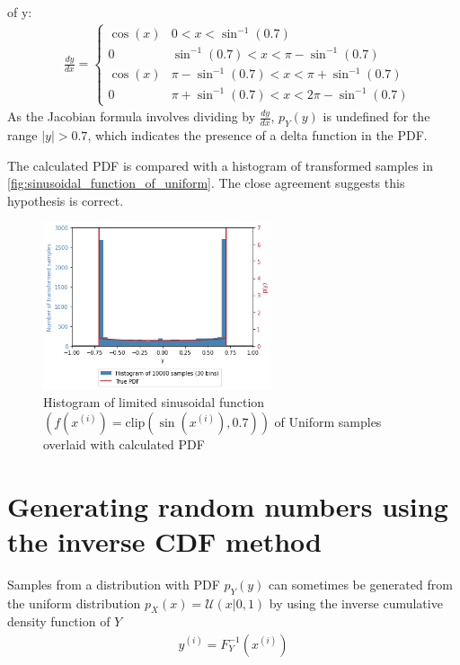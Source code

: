 \documentclass[a4paper]{article}
\begin{document}
of y:
\begin{align*}
    & \frac{dy}{dx} =
    \begin{cases}
        \cos(x) & 0 < x < \sin^{-1}(0.7) \\
        0 & \sin^{-1}(0.7) < x < \pi - \sin^{-1}(0.7) \\
        \cos(x) & \pi - \sin^{-1}(0.7) < x < \pi + \sin^{-1}(0.7) \\
        0 & \pi + \sin^{-1}(0.7) < x < 2\pi - \sin^{-1}(0.7)
   \end{cases}
\end{align*}
As the Jacobian formula involves dividing by $\frac{dy}{dx}$, $p_Y(y)$ is undefined for the range $|y| > 0.7$, which
indicates the presence of a delta function in the PDF.

The calculated PDF is compared with a histogram of transformed samples in \autoref{fig:sinusoidal_function_of_uniform}.
The close agreement suggests this hypothesis is correct.

\begin{figure}[h]
    \centering
    \includegraphics[width=0.6\textwidth]{figures/limited_sinusoidal_function_of_uniform.png}
    \caption{Histogram of limited sinusoidal function $\left(f(x^{(i)}) = \text{clip}\left(\sin\left(x^{(i)}\right), 0.7\right)\right)$
        of Uniform samples overlaid with calculated PDF}
    \label{fig:limited_sinusoidal_function_of_uniform}
\end{figure}


\section{Generating random numbers using the inverse CDF method}

Samples from a distribution with PDF $p_Y(y)$ can sometimes be generated from the uniform distribution
$p_X(x) = \mathcal{U}(x | 0, 1)$ by using the inverse cumulative density function of $Y$
\begin{align*}
    y^{(i)} = F_Y^{-1} \left( x^{(i)} \right)
\end{align*}
\end{document}
